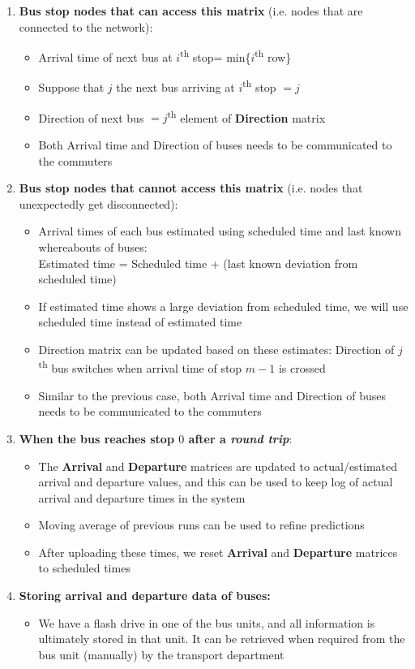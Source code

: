 \begin{enumerate}
    \item \textbf{Bus stop nodes that can access this matrix} (i.e. nodes that are connected to the network):
          \begin{itemize}
              \item Arrival time of next bus at $i$\textsuperscript{th} stop= min\{$i$\textsuperscript{th} row\}
              \item Suppose that $j$ the next bus arriving at $i$\textsuperscript{th} stop $= j$
              \item Direction of next bus $= j$\textsuperscript{th} element of \textbf{Direction} matrix
              \item Both Arrival time and Direction of buses needs to be communicated to the commuters
          \end{itemize}
    \item \textbf{Bus stop nodes that cannot access this matrix} (i.e. nodes that unexpectedly get disconnected):
          \begin{itemize}
              \item Arrival times of each bus estimated using scheduled time and last known whereabouts of buses:\\
                    Estimated time = Scheduled time + (last known deviation from scheduled
                    time)
              \item If estimated time shows a large deviation from scheduled time, we will use scheduled time instead of estimated time
              \item Direction matrix can be updated based on these estimates: Direction of $j$\textsuperscript{th} bus switches when arrival time of stop $m-1$ is crossed
              \item Similar to the previous case, both Arrival time and Direction of buses needs to be communicated to the commuters
          \end{itemize}
    \item \textbf{When the bus reaches stop \textbf{$0$} after a \textit{\gls{round trip}}}:
          \begin{itemize}
              \item  The \textbf{Arrival} and \textbf{Departure} matrices are updated to actual/estimated arrival and departure values, and this can be used to keep log of actual arrival and departure times in the system
              \item Moving average of previous runs can be used to refine predictions
              \item  After uploading these times, we reset \textbf{Arrival} and \textbf{Departure} matrices to scheduled times
          \end{itemize}
\item\textbf{Storing arrival and departure data of buses:}
\begin{itemize}
    \item We have a flash drive in one of the bus units, and all information is ultimately stored in that unit. It can be retrieved when required from the bus unit (manually) by the transport department


\end{itemize}
\end{enumerate}
